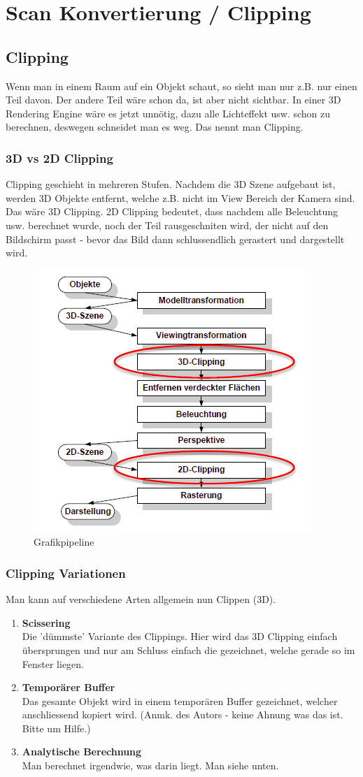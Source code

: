 \chapter{Scan Konvertierung / Clipping}

\section{Clipping}

Wenn man in einem Raum auf ein Objekt schaut, so sieht man nur z.B. nur einen Teil davon. Der andere Teil wäre schon da, ist aber nicht sichtbar. In einer 3D Rendering Engine wäre es jetzt unnötig, dazu alle Lichteffekt usw. schon zu berechnen, deswegen schneidet man es weg. Das nennt man Clipping.

\subsection{3D vs 2D Clipping}
Clipping geschieht in mehreren Stufen. Nachdem die 3D Szene aufgebaut ist, werden 3D Objekte entfernt, welche z.B. nicht im View Bereich der Kamera sind. Das wäre 3D Clipping. 2D Clipping bedeutet, dass nachdem alle Beleuchtung usw. berechnet wurde, noch der Teil rausgeschniten wird, der nicht auf den Bildschirm passt - bevor das Bild dann schlussendlich gerastert und dargestellt wird.
\begin{figure}[!ht]
	\centering
	\includegraphics[width=0.4\linewidth]{fig/grafikpipeline}
	\caption{Grafikpipeline}
	\label{fig:grafikpipeline}
\end{figure}

\subsection{Clipping Variationen}
Man kann auf verschiedene Arten allgemein nun Clippen (3D).
\begin{enumerate}
	\item \textbf{Scissering} \\
	Die 'dümmste' Variante des Clippings. Hier wird das 3D Clipping einfach übersprungen und nur am Schluss einfach die gezeichnet, welche gerade so im Fenster liegen.
	\item \textbf{Temporärer Buffer} \\
	Das gesamte Objekt wird in einem temporären Buffer gezeichnet, welcher anschliessend kopiert wird. (Anmk. des Autors - keine Ahnung was das ist. Bitte um Hilfe.)
	\item \textbf{Analytische Berechnung} \\ 
	Man berechnet irgendwie, was darin liegt. Man siehe unten.
\end{enumerate}

